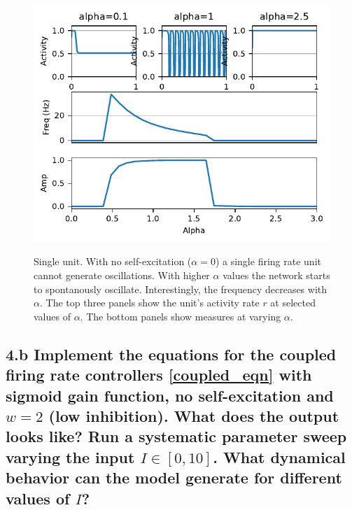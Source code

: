 \documentclass{cmc}
\begin{document}
\begin{figure}
	\centering \includegraphics[width=1\linewidth]{figures/one_unit_activities}\\
	\caption{Single unit. With no self-excitation ($\alpha=0$) a single firing rate unit cannot generate oscillations. With higher $\alpha$ values the network starts to spontanously oscillate. Interestingly, the frequency decreases with $\alpha$. The top three panels show the unit's activity rate $r$ at selected values of $\alpha$. The bottom panels show measures at varying $\alpha$.
	\label{fig:plot_one_unit}}
\end{figure}

 


\subsection*{4.b Implement the equations for the coupled firing rate controllers \ref{coupled_eqn} with sigmoid
 gain function, no self-excitation and $w=2$ (low inhibition). What does the output looks
 like? Run a systematic parameter sweep varying the input $I \in [0,10]$. What dynamical behavior can the model generate
 for different values of $I$?
}
\end{document}
